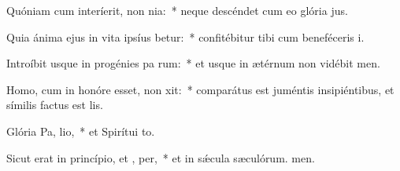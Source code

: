\item Quóniam cum interíerit, non  nia:~* neque descéndet cum eo glória jus.
\item Quia ánima ejus in vita ipsíus betur:~* confitébitur tibi cum beneféceris i.
\item Introíbit usque in progénies pa rum:~* et usque in ætérnum non vidébit men.
\item Homo, cum in honóre esset, non xit:~* comparátus est juméntis insipiéntibus, et símilis factus est lis.
\item Glória Pa,  lio,~* et Spirítui to.
\item Sicut erat in princípio, et ,  per,~* et in sǽcula sæculórum. men.
